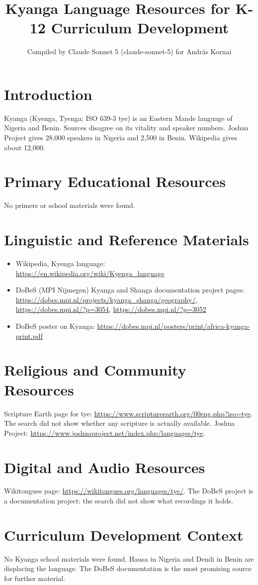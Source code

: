 \documentclass[12pt]{article}
\title{Kyanga Language Resources for K-12 Curriculum Development}
\author{Compiled by Claude Sonnet 5 (claude-sonnet-5) for Andr\'as Kornai}
\date{}
\begin{document}
\maketitle

\section{Introduction}
Kyanga (Kyenga, Tyenga; ISO 639-3 tye) is an Eastern Mande language of Nigeria and Benin. Sources disagree on its vitality and speaker numbers. Joshua Project gives 28,000 speakers in Nigeria and 2,500 in Benin. Wikipedia gives about 12,000.

\section{Primary Educational Resources}
No primers or school materials were found.

\section{Linguistic and Reference Materials}
\begin{itemize}
\item Wikipedia, Kyenga language: \url{https://en.wikipedia.org/wiki/Kyenga_language}
\item DoBeS (MPI Nijmegen) Kyanga and Shanga documentation project pages: \url{https://dobes.mpi.nl/projects/kyanga_shanga/geography/}, \url{https://dobes.mpi.nl/?p=3054}, \url{https://dobes.mpi.nl/?p=3052}
\item DoBeS poster on Kyanga: \url{https://dobes.mpi.nl/posters/print/africa-kyanga-print.pdf}
\end{itemize}

\section{Religious and Community Resources}
Scripture Earth page for tye: \url{https://www.scriptureearth.org/00eng.php?iso=tye}. The search did not show whether any scripture is actually available. Joshua Project: \url{https://www.joshuaproject.net/index.php/languages/tye}.

\section{Digital and Audio Resources}
Wikitongues page: \url{https://wikitongues.org/languages/tye/}. The DoBeS project is a documentation project; the search did not show what recordings it holds.

\section{Curriculum Development Context}
No Kyanga school materials were found. Hausa in Nigeria and Dendi in Benin are displacing the language. The DoBeS documentation is the most promising source for further material.
\end{document}
